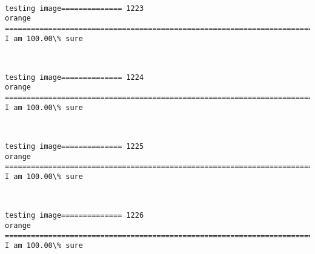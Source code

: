 \documentclass[11pt]{article}
\begin{document}
    \begin{center}
    \end{center}
    { \hspace*{\fill} \\}
    
    \begin{Verbatim}[commandchars=\\\{\}]
testing image============== 1223
orange
============================================================================
I am 100.00\% sure

    \end{Verbatim}

    \begin{center}
    \end{center}
    { \hspace*{\fill} \\}
    
    \begin{Verbatim}[commandchars=\\\{\}]
testing image============== 1224
orange
============================================================================
I am 100.00\% sure

    \end{Verbatim}

    \begin{center}
    \end{center}
    { \hspace*{\fill} \\}
    
    \begin{Verbatim}[commandchars=\\\{\}]
testing image============== 1225
orange
============================================================================
I am 100.00\% sure

    \end{Verbatim}

    \begin{center}
    \end{center}
    { \hspace*{\fill} \\}
    
    \begin{Verbatim}[commandchars=\\\{\}]
testing image============== 1226
orange
============================================================================
I am 100.00\% sure

    \end{Verbatim}
\end{document}
